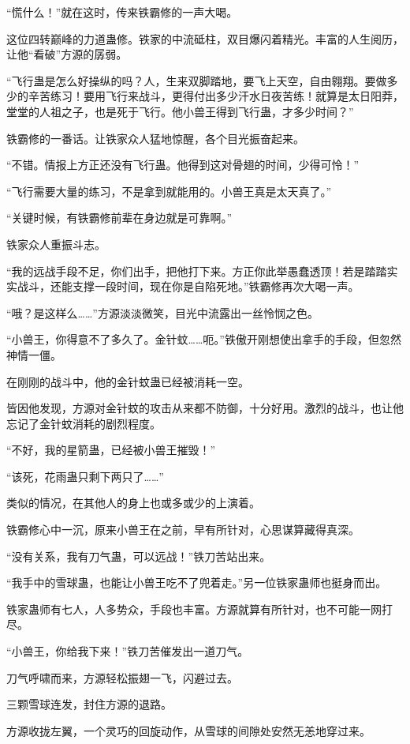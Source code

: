 \begin{this_body}
“慌什么！”就在这时，传来铁霸修的一声大喝。

这位四转巅峰的力道蛊修。铁家的中流砥柱，双目爆闪着精光。丰富的人生阅历，让他“看破”方源的孱弱。

“飞行蛊是怎么好操纵的吗？人，生来双脚踏地，要飞上天空，自由翱翔。要做多少的辛苦练习！要用飞行来战斗，更得付出多少汗水日夜苦练！就算是太日阳莽，堂堂的人祖之子，也是死于飞行。他小兽王得到飞行蛊，才多少时间？”

铁霸修的一番话。让铁家众人猛地惊醒，各个目光振奋起来。

“不错。情报上方正还没有飞行蛊。他得到这对骨翅的时间，少得可怜！”

“飞行需要大量的练习，不是拿到就能用的。小兽王真是太天真了。”

“关键时候，有铁霸修前辈在身边就是可靠啊。”

铁家众人重振斗志。

“我的远战手段不足，你们出手，把他打下来。方正你此举愚蠢透顶！若是踏踏实实战斗，还能支撑一段时间，现在你是自陷死地。”铁霸修再次大喝一声。

“哦？是这样么……”方源淡淡微笑，目光中流露出一丝怜悯之色。

“小兽王，你得意不了多久了。金针蚊……呃。”铁傲开刚想使出拿手的手段，但忽然神情一僵。

在刚刚的战斗中，他的金针蚊蛊已经被消耗一空。

皆因他发现，方源对金针蚊的攻击从来都不防御，十分好用。激烈的战斗，也让他忘记了金针蚊消耗的剧烈程度。

“不好，我的星箭蛊，已经被小兽王摧毁！”

“该死，花雨蛊只剩下两只了……”

类似的情况，在其他人的身上也或多或少的上演着。

铁霸修心中一沉，原来小兽王在之前，早有所针对，心思谋算藏得真深。

“没有关系，我有刀气蛊，可以远战！”铁刀苦站出来。

“我手中的雪球蛊，也能让小兽王吃不了兜着走。”另一位铁家蛊师也挺身而出。

铁家蛊师有七人，人多势众，手段也丰富。方源就算有所针对，也不可能一网打尽。

“小兽王，你给我下来！”铁刀苦催发出一道刀气。

刀气呼啸而来，方源轻松振翅一飞，闪避过去。

三颗雪球连发，封住方源的退路。

方源收拢左翼，一个灵巧的回旋动作，从雪球的间隙处安然无恙地穿过来。


\end{this_body}
